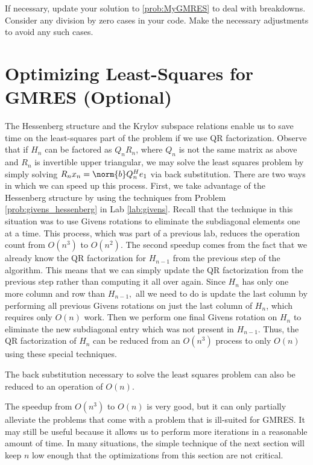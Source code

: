 \begin{problem}
If necessary, update your solution to \ref{prob:MyGMRES} to deal with breakdowns.
Consider any division by zero cases in your code.  Make the necessary adjustments to avoid any such cases.
\label{prob:GMRES3}
\end{problem}

\section*{Optimizing Least-Squares for GMRES (Optional)}
The Hessenberg structure and the Krylov subspace relations enable us to save time on the least-squares part of the problem if we use QR factorization.
Observe that if $H_n$ can be factored as $Q_n R_n$, where $Q_n$ is not the same matrix as above and $R_n$ is invertible upper triangular, we may solve the least squares problem by simply solving $R_n x_n=\norm{b} Q_{n}^{H}e_1$ via back substitution.
There are two ways in which we can speed up this process.
First, we take advantage of the Hessenberg structure by using the techniques from Problem \ref{prob:givens_hessenberg} in Lab \ref{lab:givens}.
Recall that the technique in this situation was to use Givens rotations to eliminate the subdiagonal elements one at a time.
This process, which was part of a previous lab, reduces the operation count from $O(n^3)$ to $O(n^2)$.
The second speedup comes from the fact that we already know the QR factorization for $H_{n-1}$ from the previous step of the algorithm.
This means that we can simply update the QR factorization from the previous step rather than computing it all over again.
Since $H_{n}$ has only one more column and row than $H_{n-1},$ all we need to do is update the last column by performing all previous Givens rotations on just the last column of $H_n$, which requires only $O(n)$ work.
Then we perform one final Givens rotation on $H_n$ to eliminate the new subdiagonal entry which was not present in $H_{n-1}$.
Thus, the QR factorization of $H_n$ can be reduced from an $O(n^3)$ process to only $O(n)$ using these special techniques.

The back substitution necessary to solve the least squares problem can also be reduced to an operation of $O(n)$.

The speedup from $O(n^3)$ to $O(n)$ is very good, but it can only partially alleviate the problems that come with a problem that is ill-suited for GMRES.
It may still be useful because it allows us to perform more iterations in a reasonable amount of time.
In many situations, the simple technique of the next section will keep $n$ low enough that the optimizations from this section are not critical.
%

